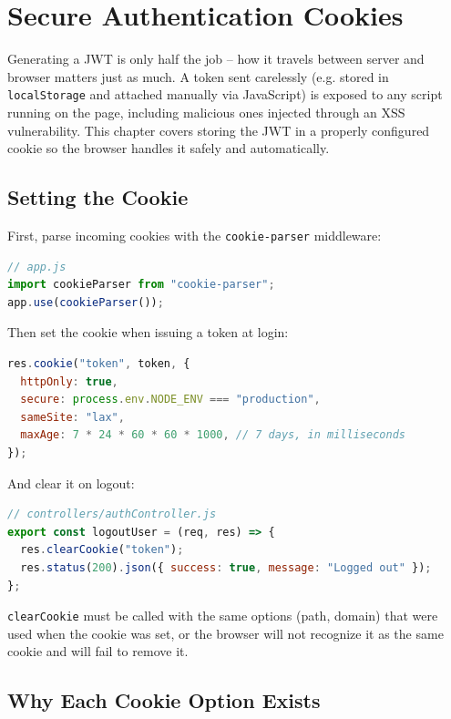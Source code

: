\chapter{Secure Authentication Cookies}

Generating a JWT is only half the job -- how it travels between server and
browser matters just as much. A token sent carelessly (e.g. stored in
\texttt{localStorage} and attached manually via JavaScript) is exposed to
any script running on the page, including malicious ones injected through an
XSS vulnerability. This chapter covers storing the JWT in a properly
configured cookie so the browser handles it safely and automatically.

\section{Setting the Cookie}

First, parse incoming cookies with the \texttt{cookie-parser} middleware:

\begin{lstlisting}[language=JavaScript]
// app.js
import cookieParser from "cookie-parser";
app.use(cookieParser());
\end{lstlisting}

Then set the cookie when issuing a token at login:

\begin{lstlisting}[language=JavaScript]
res.cookie("token", token, {
  httpOnly: true,
  secure: process.env.NODE_ENV === "production",
  sameSite: "lax",
  maxAge: 7 * 24 * 60 * 60 * 1000, // 7 days, in milliseconds
});
\end{lstlisting}

And clear it on logout:

\begin{lstlisting}[language=JavaScript]
// controllers/authController.js
export const logoutUser = (req, res) => {
  res.clearCookie("token");
  res.status(200).json({ success: true, message: "Logged out" });
};
\end{lstlisting}

\begin{warnbox}[WARNING]
\texttt{clearCookie} must be called with the same options (path, domain)
that were used when the cookie was set, or the browser will not recognize it
as the same cookie and will fail to remove it.
\end{warnbox}

\section{Why Each Cookie Option Exists}


